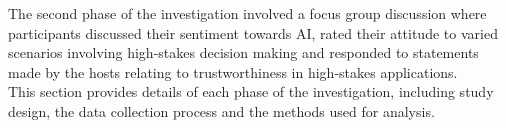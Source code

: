 \documentclass[manuscript,screen,review]{acmart}
\begin{document}
The second phase of the investigation involved a focus group discussion where participants discussed their sentiment towards AI, rated their attitude to varied scenarios involving high-stakes decision making and responded to statements made by the hosts relating to trustworthiness in high-stakes applications.\\

This section provides details of each phase of the investigation, including study design, the data collection process and the methods used for analysis.


\end{document}
